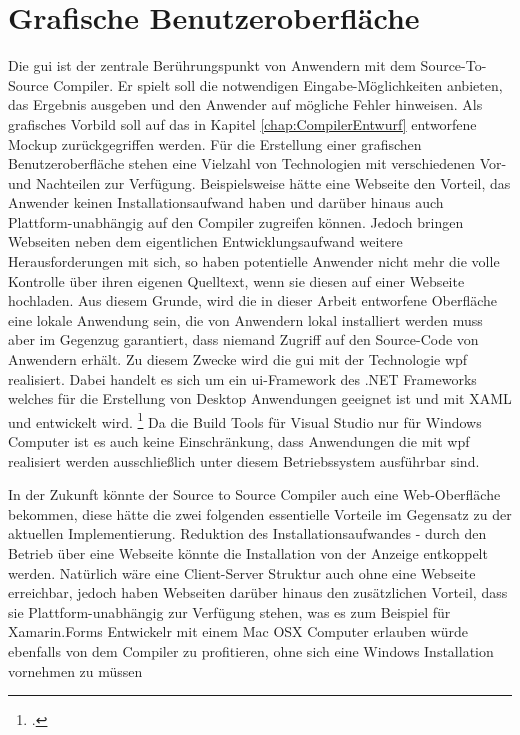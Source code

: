 \section{Grafische Benutzeroberfläche}
Die \ac{gui} ist der zentrale Berührungspunkt von Anwendern mit dem Source-To-Source Compiler.  Er spielt soll die notwendigen Eingabe-Möglichkeiten anbieten,  das Ergebnis ausgeben und den Anwender auf mögliche Fehler hinweisen.  Als grafisches Vorbild soll auf das in Kapitel \ref{chap:CompilerEntwurf} entworfene Mockup zurückgegriffen werden.  Für die Erstellung einer grafischen Benutzeroberfläche stehen eine Vielzahl von Technologien mit verschiedenen Vor- und Nachteilen zur Verfügung.  Beispielsweise hätte eine Webseite den Vorteil,  das Anwender keinen Installationsaufwand haben und darüber hinaus auch Plattform-unabhängig auf den Compiler zugreifen können.  Jedoch bringen Webseiten neben dem eigentlichen Entwicklungsaufwand weitere Herausforderungen mit sich,  so haben potentielle Anwender nicht mehr die volle Kontrolle über ihren eigenen Quelltext, wenn sie diesen auf einer Webseite hochladen.  
Aus diesem Grunde,  wird die in dieser Arbeit entworfene Oberfläche eine lokale Anwendung sein,  die von Anwendern lokal installiert werden muss aber im Gegenzug garantiert,  dass niemand Zugriff auf den Source-Code von Anwendern erhält.  Zu diesem Zwecke wird die \ac{gui} mit der Technologie \ac{wpf} realisiert.  Dabei handelt es sich um ein \ac{ui}-Framework des .NET Frameworks welches für die Erstellung von Desktop Anwendungen geeignet ist und mit XAML und \Csharp entwickelt wird.  \footcite[Vgl.][S. 1f]{Wenger2012} Da die Build Tools für Visual Studio nur für Windows Computer ist es auch keine Einschränkung,  dass Anwendungen die mit \ac{wpf} realisiert werden ausschließlich unter diesem Betriebssystem ausführbar sind.

In der Zukunft könnte der Source to Source Compiler auch eine Web-Oberfläche bekommen,  diese hätte die zwei folgenden essentielle Vorteile im Gegensatz zu der aktuellen Implementierung.  Reduktion des Installationsaufwandes - durch den Betrieb über eine Webseite könnte die Installation von der Anzeige entkoppelt werden.  Natürlich wäre eine Client-Server Struktur auch ohne eine Webseite erreichbar,  jedoch haben Webseiten darüber hinaus den zusätzlichen Vorteil,  dass sie Plattform-unabhängig zur Verfügung stehen,  was es zum Beispiel für Xamarin.Forms Entwickelr mit einem Mac OSX Computer erlauben würde ebenfalls von dem Compiler zu profitieren, ohne sich eine Windows Installation vornehmen zu müssen
